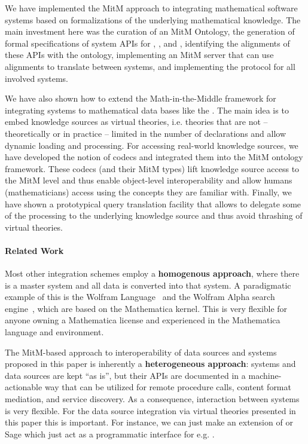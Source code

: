   We have implemented the MitM approach to integrating mathematical software systems based on formalizations of the underlying mathematical knowledge.
  The main investment here was the curation of an MitM Ontology, the generation of formal specifications of system APIs for \Sage, \GAP, and \Singular, identifying the alignments of these APIs with the ontology, implementing an MitM server that can use alignments to translate between systems, and implementing the \SCSCP protocol for all involved systems.

  We have also shown how to extend the Math-in-the-Middle framework for integrating systems to mathematical data bases like the \lmfdb. 
The main idea is to embed knowledge sources as virtual theories, i.e. theories that are not -- theoretically or in practice -- limited in the number of declarations and allow dynamic loading and processing. 
For accessing real-world knowledge sources, we have developed the notion of codecs and integrated them into the MitM ontology framework. 
These codecs (and their MitM types) lift knowledge source access to the MitM level and thus enable object-level interoperability and allow humans (mathematicians) access using the concepts they are familiar with. 
Finally, we have shown a prototypical query translation facility that allows to delegate some of the processing to the underlying knowledge source and thus avoid thrashing of virtual theories. 

\paragraph{Related Work} Most other integration schemes employ a \textbf{homogenous approach}, where there is a master system and all data is converted into that system. 
A paradigmatic example of this is the Wolfram Language~\cite{WolframLanguage:wikipedia} and the Wolfram Alpha search engine~\cite{WolframAlpha:on}, which are based on the Mathematica kernel. 
This is very flexible for anyone owning a Mathematica license and experienced in the Mathematica language and environment.

The MitM-based approach to interoperability of data sources and systems proposed in this paper is inherently a \textbf{heterogeneous approach}: systems and data sources are kept ``as is'', but their APIs are documented in a machine-actionable way that can be utilized for remote procedure calls, content format mediation, and service discovery. 
As a consequence, interaction between systems is very flexible.
For the data source integration via virtual theories presented in this paper this is important. 
For instance, we can just make an extension of \mmt or Sage which just act as a programmatic interface for e.g. \lmfdb. 

